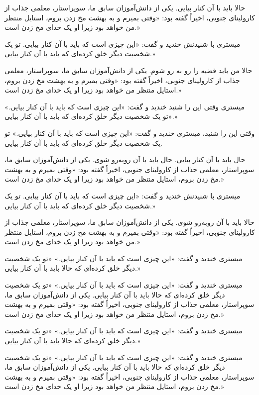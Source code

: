 حالا باید با آن کنار بیایی. یکی از دانش‌آموزان سابق ما، سوپراستار، معلمی جذاب از کارولینای جنوبی، اخیراً گفته بود: «وقتی بمیرم و به بهشت مخ زدن بروم، استایل منتظر من خواهد بود زیرا او یک خدای مخ زدن است.»

میستری با شنیدنش خندید و گفت: «این چیزی است که باید با آن کنار بیایی. تو یک شخصیت دیگر خلق کرده‌ای که باید با آن کنار بیایی.»

حالا من باید قضیه را رو به رو شوم. یکی از دانش‌آموزان سابق ما، سوپراستار، معلمی جذاب از کارولینای جنوبی، اخیراً گفته بود: «وقتی بمیرم و به بهشت مخ زدن بروم، استایل منتظر من خواهد بود زیرا او یک خدای مخ زدن است.»

میستری وقتی این را شنید خندید و گفت: «این چیزی است که باید با آن کنار بیایی.» «تو یک شخصیت دیگر خلق کرده‌ای که باید با آن کنار بیایی.»

وقتی این را شنید، میستری خندید و گفت: «این چیزی است که باید با آن کنار بیایی.» تو یک شخصیت دیگر خلق کرده‌ای که باید با آن کنار بیایی. 

حال باید با آن کنار بیایی. حال باید با آن روبه‌رو شوی. یکی از دانش‌آموزان سابق ما، سوپراستار، معلمی جذاب از کارولینای جنوبی، اخیراً گفته بود: «وقتی بمیرم و به بهشت مخ زدن بروم، استایل منتظر من خواهد بود زیرا او یک خدای مخ زدن است.»

میستری با شنیدنش خندید و گفت: «این چیزی است که باید با آن کنار بیایی. تو یک شخصیت دیگر خلق کرده‌ای که باید با آن کنار بیایی.»

حالا باید با آن روبه‌رو شوی. یکی از دانش‌آموزان سابق ما، سوپراستار، معلمی جذاب از کارولینای جنوبی، اخیراً گفته بود: «وقتی بمیرم و به بهشت مخ زدن بروم، استایل منتظر من خواهد بود زیرا او یک خدای مخ زدن است.»

میستری خندید و گفت: «این چیزی است که باید با آن کنار بیایی.» «تو یک شخصیت دیگر خلق کرده‌ای که حالا باید با آن کنار بیایی.»

میستری خندید و گفت: «این چیزی است که باید با آن کنار بیایی.» «تو یک شخصیت دیگر خلق کرده‌ای که حالا باید با آن کنار بیایی. یکی از دانش‌آموزان سابق ما، سوپراستار، معلمی جذاب از کارولینای جنوبی، اخیراً گفته بود: «وقتی بمیرم و به بهشت مخ زدن بروم، استایل منتظر من خواهد بود زیرا او یک خدای مخ زدن است.»

میستری خندید و گفت: «این چیزی است که باید با آن کنار بیایی.» «تو یک شخصیت دیگر خلق کرده‌ای که حالا باید با آن کنار بیایی.»

میستری خندید و گفت: «این چیزی است که باید با آن کنار بیایی.» «تو یک شخصیت دیگر خلق کرده‌ای که حالا باید با آن کنار بیایی. یکی از دانش‌آموزان سابق ما، سوپراستار، معلمی جذاب از کارولینای جنوبی، اخیراً گفته بود: «وقتی بمیرم و به بهشت مخ زدن بروم، استایل منتظر من خواهد بود زیرا او یک خدای مخ زدن است.»

